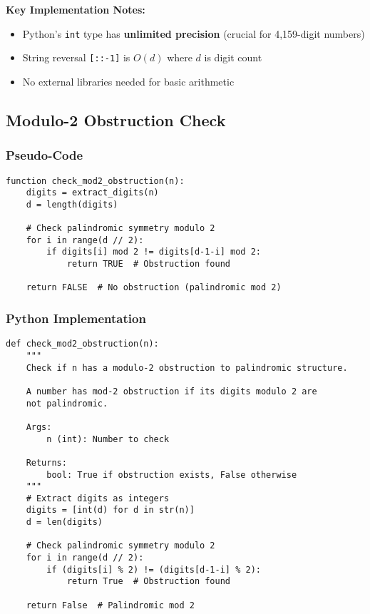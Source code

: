 \documentclass[11pt,a4paper]{article}
\newcommand{\code}[1]{\texttt{#1}}
\begin{document}
\textbf{Key Implementation Notes:}
\begin{itemize}
\item Python's \code{int} type has \textbf{unlimited precision} (crucial for 4,159-digit numbers)
\item String reversal \code{[::-1]} is $O(d)$ where $d$ is digit count
\item No external libraries needed for basic arithmetic
\end{itemize}

\subsection{Modulo-2 Obstruction Check}

\subsubsection{Pseudo-Code}

\begin{lstlisting}[style=pseudocodestyle, caption={Modulo-2 Check Pseudo-Code}]
function check_mod2_obstruction(n):
    digits = extract_digits(n)
    d = length(digits)
    
    # Check palindromic symmetry modulo 2
    for i in range(d // 2):
        if digits[i] mod 2 != digits[d-1-i] mod 2:
            return TRUE  # Obstruction found
    
    return FALSE  # No obstruction (palindromic mod 2)
\end{lstlisting}

\subsubsection{Python Implementation}

\begin{lstlisting}[style=pythonstyle, caption={Modulo-2 Obstruction Check}]
def check_mod2_obstruction(n):
    """
    Check if n has a modulo-2 obstruction to palindromic structure.
    
    A number has mod-2 obstruction if its digits modulo 2 are 
    not palindromic.
    
    Args:
        n (int): Number to check
        
    Returns:
        bool: True if obstruction exists, False otherwise
    """
    # Extract digits as integers
    digits = [int(d) for d in str(n)]
    d = len(digits)
    
    # Check palindromic symmetry modulo 2
    for i in range(d // 2):
        if (digits[i] % 2) != (digits[d-1-i] % 2):
            return True  # Obstruction found
    
    return False  # Palindromic mod 2
\end{lstlisting}
\end{document}
